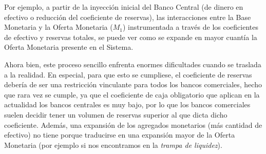 \documentclass[10pt,a4paper]{article}
\begin{document}
Por ejemplo, a partir de la inyección inicial del Banco Central (de dinero en efectivo o reducción del coeficiente de reservas), las interacciones entre la Base Monetaria y la Oferta Monetaria ($M_1$) instrumentada a través de los coeficientes de efectivo y reservas totales, se puede ver como se expande en mayor cuantía la Oferta Monetaria presente en el Sistema. 

Ahora bien, este proceso sencillo enfrenta enormes dificultades cuando se traslada a la realidad. En especial, para que esto se cumpliese, el coeficiente de reservas debería de ser una restricción vinculante para todos los bancos comerciales, hecho que rara vez se cumple, ya que el coeficiente de caja obligatorio que aplican en la actualidad los bancos centrales es muy bajo, por lo que los bancos comerciales suelen decidir tener un volumen de reservas superior al que dicta dicho coeficiente. Además, una expansión de los agregados monetarios (más cantidad de efectivo) no tiene porque traducirse en una expansión mayor de la Oferta Monetaria (por ejemplo si nos encontramos en la \textit{trampa de liquidez}).
\end{document}
